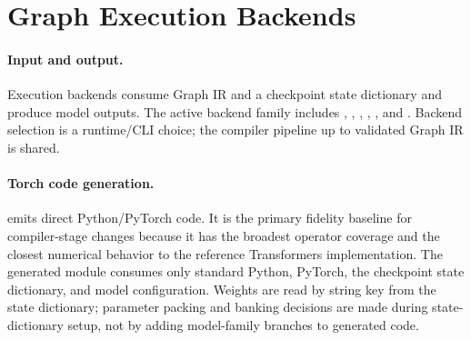 \section{Graph Execution Backends}

\paragraph{Input and output.}
Execution backends consume Graph IR and a checkpoint state dictionary and
produce model outputs.  The active backend family includes
, , ,
, , and
.  Backend selection is a runtime/CLI choice; the
compiler pipeline up to validated Graph IR is shared.

\paragraph{Torch code generation.}
 emits direct Python/PyTorch code.  It is the primary
fidelity baseline for compiler-stage changes because it has the broadest
operator coverage and the closest numerical behavior to the reference
Transformers implementation.  The generated module consumes only standard
Python, PyTorch, the checkpoint state dictionary, and model configuration.
Weights are read by string key from the state dictionary; parameter packing and
banking decisions are made during state-dictionary setup, not by adding
model-family branches to generated code.

